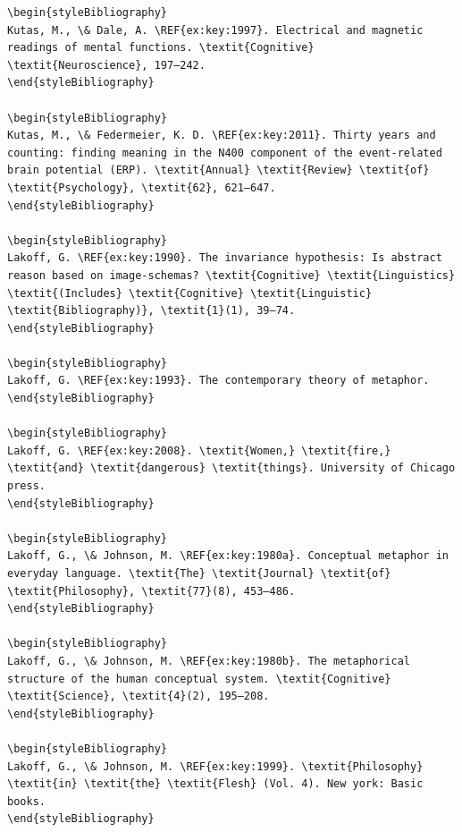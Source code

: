 \begin{verbatim}
\begin{styleBibliography}
Kutas, M., \& Dale, A. \REF{ex:key:1997}. Electrical and magnetic readings of mental functions. \textit{Cognitive} \textit{Neuroscience}, 197–242.
\end{styleBibliography}

\begin{styleBibliography}
Kutas, M., \& Federmeier, K. D. \REF{ex:key:2011}. Thirty years and counting: finding meaning in the N400 component of the event-related brain potential (ERP). \textit{Annual} \textit{Review} \textit{of} \textit{Psychology}, \textit{62}, 621–647.
\end{styleBibliography}

\begin{styleBibliography}
Lakoff, G. \REF{ex:key:1990}. The invariance hypothesis: Is abstract reason based on image-schemas? \textit{Cognitive} \textit{Linguistics} \textit{(Includes} \textit{Cognitive} \textit{Linguistic} \textit{Bibliography)}, \textit{1}(1), 39–74.
\end{styleBibliography}

\begin{styleBibliography}
Lakoff, G. \REF{ex:key:1993}. The contemporary theory of metaphor.
\end{styleBibliography}

\begin{styleBibliography}
Lakoff, G. \REF{ex:key:2008}. \textit{Women,} \textit{fire,} \textit{and} \textit{dangerous} \textit{things}. University of Chicago press.
\end{styleBibliography}

\begin{styleBibliography}
Lakoff, G., \& Johnson, M. \REF{ex:key:1980a}. Conceptual metaphor in everyday language. \textit{The} \textit{Journal} \textit{of} \textit{Philosophy}, \textit{77}(8), 453–486.
\end{styleBibliography}

\begin{styleBibliography}
Lakoff, G., \& Johnson, M. \REF{ex:key:1980b}. The metaphorical structure of the human conceptual system. \textit{Cognitive} \textit{Science}, \textit{4}(2), 195–208.
\end{styleBibliography}

\begin{styleBibliography}
Lakoff, G., \& Johnson, M. \REF{ex:key:1999}. \textit{Philosophy} \textit{in} \textit{the} \textit{Flesh} (Vol. 4). New york: Basic books.
\end{styleBibliography}


\end{verbatim}
